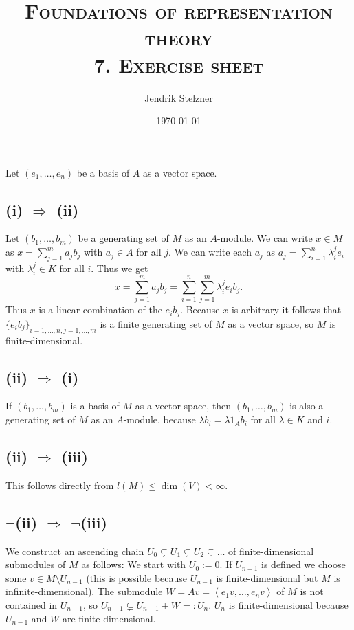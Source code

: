 \documentclass[a4paper,10pt]{article}
\title{\textsc{Foundations of representation theory \\ \Large 7. Exercise sheet}}
\author{Jendrik Stelzner}
\date{\today}
\theoremstyle{definition}
\newcommand{\gen}[1]{\left\langle#1\right\rangle}
\begin{document}
\maketitle




\addtocounter{section}{1}
\section{}
Let $(e_1, \ldots, e_n)$ be a basis of $A$ as a vector space.


\subsection*{(i) $\Rightarrow$ (ii)}
Let $(b_1, \ldots, b_m)$ be a generating set of $M$ as an $A$-module. We can write $x \in M$ as $x = \sum_{j=1}^m a_j b_j$ with $a_j \in A$ for all $j$. We can write each $a_j$ as $a_j = \sum_{i=1}^n \lambda^j_i e_i$ with $\lambda^j_i \in K$ for all $i$. Thus we get
\[
 x = \sum_{j=1}^m a_j b_j =  \sum_{i=1}^n \sum_{j=1}^m \lambda^j_i e_i b_j.
\]
Thus $x$ is a linear combination of the $e_i b_j$. Because $x$ is arbitrary it follows that $\{e_i b_j\}_{i=1,\ldots,n, j=1,\ldots,m}$ is a finite generating set of $M$ as a vector space, so $M$ is finite-dimensional.


\subsection*{(ii) $\Rightarrow$ (i)}
If $(b_1, \ldots, b_m)$ is a basis of $M$ as a vector space, then $(b_1, \ldots, b_m)$ is also a generating set of $M$ as an $A$-module, because $\lambda b_i = \lambda 1_A b_i$ for all $\lambda \in K$ and $i$.


\subsection*{(ii) $\Rightarrow$ (iii)}
This follows directly from $l(M) \leq \dim(V) < \infty$.


\subsection*{$\neg$(ii) $\Rightarrow$ $\neg$(iii)}
We construct an ascending chain $U_0 \subsetneq U_1 \subsetneq U_2 \subsetneq \ldots$ of finite-dimensional submodules of $M$ as follows: We start with $U_0 := 0$. If $U_{n-1}$ is defined we choose some $v \in M \setminus U_{n-1}$ (this is possible because $U_{n-1}$ is finite-dimensional but $M$ is infinite-dimensional). The submodule $W = Av = \gen{e_1 v, \ldots, e_n v}$ of $M$ is not contained in $U_{n-1}$, so $U_{n-1} \subsetneq U_{n-1} + W =: U_n$. $U_n$ is finite-dimensional because $U_{n-1}$ and $W$ are finite-dimensional.
\end{document}
